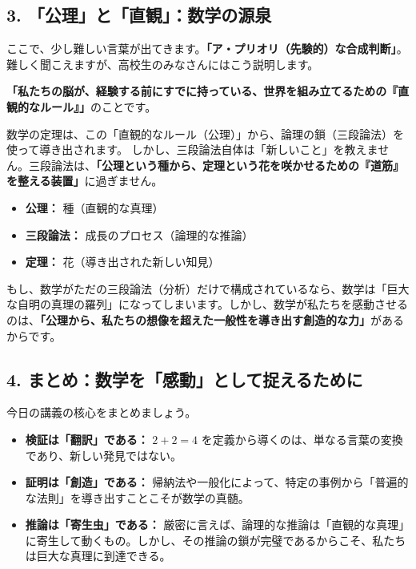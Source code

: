 \documentclass[a4paper,11pt,openany]{ltjsbook}
\begin{document}
\begin{lecturebox}
\subsection*{3. 「公理」と「直観」：数学の源泉}

ここで、少し難しい言葉が出てきます。\textbf{「ア・プリオリ（先験的）な合成判断」}。
難しく聞こえますが、高校生のみなさんにはこう説明します。

\textbf{「私たちの脳が、経験する前にすでに持っている、世界を組み立てるための『直観的なルール』」}のことです。

数学の定理は、この「直観的なルール（公理）」から、論理の鎖（三段論法）を使って導き出されます。
しかし、三段論法自体は「新しいこと」を教えません。三段論法は、\textbf{「公理という種から、定理という花を咲かせるための『道筋』を整える装置」}に過ぎません。

\begin{itemize}[leftmargin=2em]
\item \textbf{公理：} 種（直観的な真理）
\item \textbf{三段論法：} 成長のプロセス（論理的な推論）
\item \textbf{定理：} 花（導き出された新しい知見）
\end{itemize}

もし、数学がただの三段論法（分析）だけで構成されているなら、数学は「巨大な自明の真理の羅列」になってしまいます。しかし、数学が私たちを感動させるのは、\textbf{「公理から、私たちの想像を超えた一般性を導き出す創造的な力」}があるからです。

\subsection*{4. まとめ：数学を「感動」として捉えるために}

今日の講義の核心をまとめましょう。

\begin{itemize}[leftmargin=2em]
\item \textbf{検証は「翻訳」である：} $2+2=4$ を定義から導くのは、単なる言葉の変換であり、新しい発見ではない。
\item \textbf{証明は「創造」である：} 帰納法や一般化によって、特定の事例から「普遍的な法則」を導き出すことこそが数学の真髄。
\item \textbf{推論は「寄生虫」である：} 厳密に言えば、論理的な推論は「直観的な真理」に寄生して動くもの。しかし、その推論の鎖が完璧であるからこそ、私たちは巨大な真理に到達できる。
\end{itemize}


\end{lecturebox}
\end{document}
